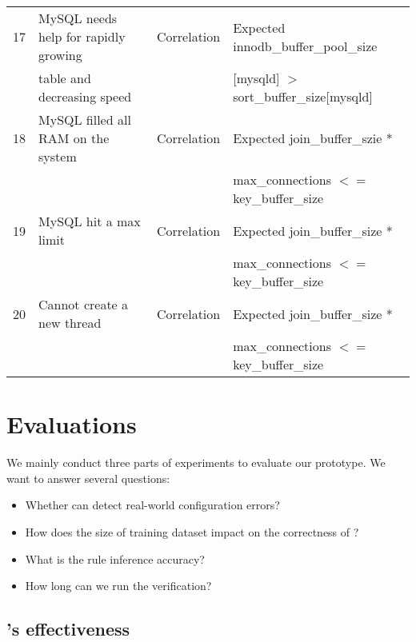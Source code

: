 \begin{table*}[t]
\begin{small}
\begin{tabular}{|l|l|l|l|}
17 & MySQL needs help for rapidly growing 
& Correlation
& Expected innodb\_buffer\_pool\_size \\ & table and decreasing speed
&&  [mysqld] $>$ sort\_buffer\_size[mysqld] \\ \hline

18 & MySQL filled all RAM on the system
& Correlation
& Expected join\_buffer\_szie * \\ & && max\_connections $<=$ key\_buffer\_size \\ \hline


19 & MySQL hit a max limit
& Correlation
& Expected join\_buffer\_size * \\ &&& max\_connections $<=$ key\_buffer\_size \\ \hline

20 & Cannot create a new thread
& Correlation
& Expected join\_buffer\_size * \\ &&& max\_connections $<=$ key\_buffer\_size \\ \hline

\end{tabular}
\end{small}
\end{table*}



\section{Evaluations}

We mainly conduct three parts of experiments to evaluate our \app
prototype. We want to answer several questions:

\begin{itemize}

\item Whether \app can detect real-world configuration errors?

\item How does the size of training dataset impact on the correctness
  of \app?

\item What is the rule inference accuracy?

\item How long can we run the verification?

\end{itemize}

\subsection{\app's effectiveness}

